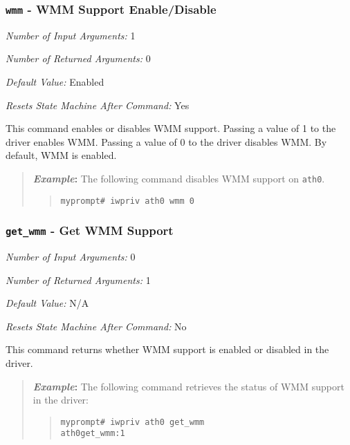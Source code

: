 \documentclass[10pt,fullpage]{article}
\newcommand{\mytt}[1]{{\texttt{#1}}}
\newcommand{\bv}{\begin{verse}}
\newcommand{\ev}{\end{verse}}
\newcommand{\cmd}[1]{{\texttt{myprompt\# #1}}}
\newcommand{\argdesc}[4]{\begin{description}
\itemsep -6pt
\item \textit{Number of Input Arguments:} #1
\item \textit{Number of Returned Arguments:} #2
\item \textit{Default Value:} #3
\item \textit{Resets State Machine After Command:} #4
\end{description}
}
\newenvironment{example}{\begin{quote}\textbf{\textit{Example}:}}{\end{quote}}
\begin{document}
\subsubsection{\mytt{wmm} - WMM Support Enable/Disable}
\argdesc{1}{0}{Enabled}{Yes}
This command enables or disables WMM support. Passing a value of 1 to
the driver enables WMM. Passing a value of 0 to the driver disables
WMM.  By default, WMM is enabled.
\begin{example}
  The following command disables WMM support on \mytt{ath0}.
  \bv
  \cmd{iwpriv ath0 wmm 0}
  \ev
\end{example}

\subsubsection{\mytt{get\_wmm} - Get WMM Support}
\argdesc{0}{1}{N/A}{No}
This command returns whether WMM support is enabled or disabled in the
driver.
\begin{example}
  The following command retrieves the status of WMM support in the
  driver:
  \bv
  \cmd{iwpriv ath0 get\_wmm}\\
  \mytt{ath0\hspace{32pt}get\_wmm:1}
  \ev
\end{example}
\end{document}
